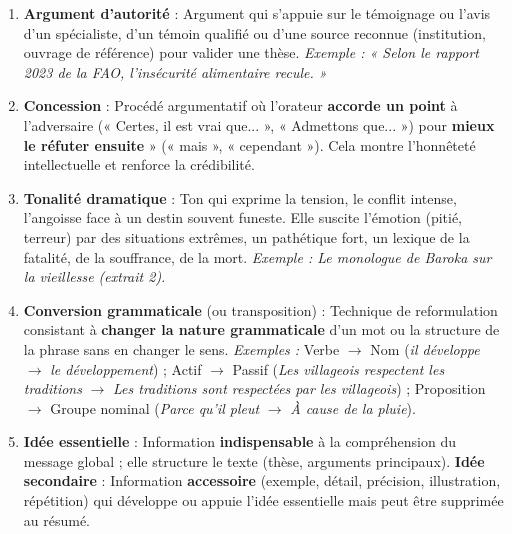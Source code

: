 \documentclass[11pt]{article}
\newcommand{\cle}[1]{{\popxbold\color{popdark}#1}}
\begin{document}
\begin{corrige}
\begin{enumerate}
    \item \textbf{Argument d'autorité} : Argument qui s'appuie sur le témoignage ou l'avis d'un \cle{spécialiste}, d'un \cle{témoin qualifié} ou d'une \cle{source reconnue} (institution, ouvrage de référence) pour valider une thèse. \textit{Exemple : « Selon le rapport 2023 de la FAO, l'insécurité alimentaire recule. »}
    \item \textbf{Concession} : Procédé argumentatif où l'orateur \textbf{accorde un point} à l'adversaire (« Certes, il est vrai que... », « Admettons que... ») pour \textbf{mieux le réfuter ensuite} » (« mais », « cependant »). Cela montre l'honnêteté intellectuelle et renforce la crédibilité.
    \item \textbf{Tonalité dramatique} : Ton qui exprime la \cle{tension}, le \cle{conflit} intense, l'angoisse face à un destin souvent funeste. Elle suscite l'émotion (pitié, terreur) par des situations extrêmes, un pathétique fort, un lexique de la fatalité, de la souffrance, de la mort. \textit{Exemple : Le monologue de Baroka sur la vieillesse (extrait 2).}
    \item \textbf{Conversion grammaticale} (ou \cle{transposition}) : Technique de reformulation consistant à \textbf{changer la nature grammaticale} d'un mot ou la structure de la phrase sans en changer le sens. \textit{Exemples :} Verbe $\to$ Nom (\emph{il développe} $\to$ \emph{le développement}) ; Actif $\to$ Passif (\emph{Les villageois respectent les traditions} $\to$ \emph{Les traditions sont respectées par les villageois}) ; Proposition $\to$ Groupe nominal (\emph{Parce qu'il pleut} $\to$ \emph{À cause de la pluie}).
    \item \textbf{Idée essentielle} : Information \textbf{indispensable} à la compréhension du message global ; elle structure le texte (thèse, arguments principaux). \textbf{Idée secondaire} : Information \textbf{accessoire} (exemple, détail, précision, illustration, répétition) qui développe ou appuie l'idée essentielle mais peut être supprimée au résumé.
\end{enumerate}
\end{corrige}
\end{document}
